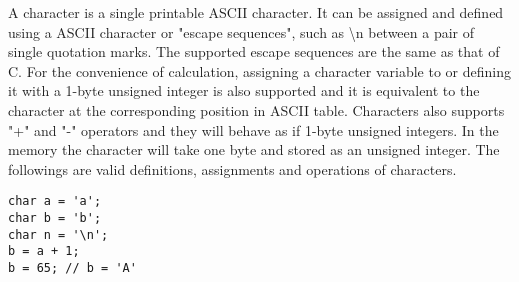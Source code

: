 A character is a single printable ASCII character. It can be assigned and defined using a ASCII character or "escape sequences", such as \textbackslash n between a pair of single quotation marks. The supported escape sequences are the same as that of C. For the convenience of calculation, assigning a character variable to or defining it with a 1-byte unsigned integer is also supported and it is equivalent to the character at the corresponding position in ASCII table. Characters also supports "+" and "-" operators and they will behave as if 1-byte unsigned integers. In the memory the character will take one byte and stored as an unsigned integer. The followings are valid definitions, assignments and operations of characters.
\begin{lstlisting}[caption={char\_definition.csm}, captionpos=b]
char a = 'a';
char b = 'b';
char n = '\n';
b = a + 1;
b = 65; // b = 'A'
\end{lstlisting}
